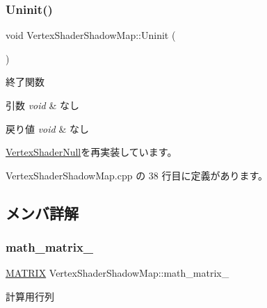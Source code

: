 \subsubsection{\texorpdfstring{Uninit()}{Uninit()}}
{\footnotesize\ttfamily void Vertex\+Shader\+Shadow\+Map\+::\+Uninit (\begin{DoxyParamCaption}{ }\end{DoxyParamCaption})\hspace{0.3cm}{\ttfamily [virtual]}}



終了関数 


\begin{DoxyParams}{引数}
{\em void} & なし \\
\hline
\end{DoxyParams}

\begin{DoxyRetVals}{戻り値}
{\em void} & なし \\
\hline
\end{DoxyRetVals}


\mbox{\hyperlink{class_vertex_shader_null_adf758f295d2803c6d8bd7e05e461abec}{Vertex\+Shader\+Null}}を再実装しています。



 Vertex\+Shader\+Shadow\+Map.\+cpp の 38 行目に定義があります。



\subsection{メンバ詳解}
\mbox{\label{class_vertex_shader_shadow_map_a5b3069ce052a5de3e19ea578d8bdb950}} 
\subsubsection{\texorpdfstring{math\+\_\+matrix\+\_\+}{math\_matrix\_}}
{\footnotesize\ttfamily \mbox{\hyperlink{_matrix_8h_a032295cd9fb1b711757c90667278e744}{M\+A\+T\+R\+IX}} Vertex\+Shader\+Shadow\+Map\+::math\+\_\+matrix\+\_\+\hspace{0.3cm}{\ttfamily [private]}}



計算用行列 



